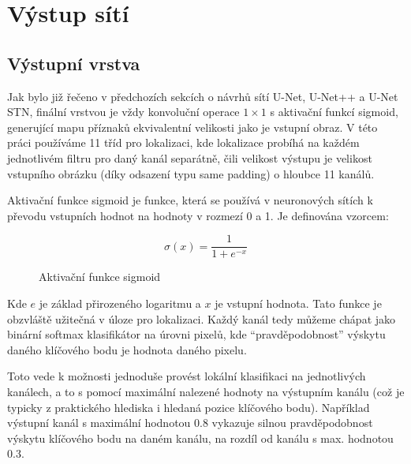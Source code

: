 \section{Výstup sítí}
\label{sec:Chapter46}
\subsection{Výstupní vrstva}
Jak bylo již řečeno v předchozích sekcích o návrhů sítí U-Net, U-Net++ a U-Net STN, finální vrstvou je vždy konvoluční operace $1\times1$ s aktivační funkcí sigmoid, generující mapu příznaků ekvivalentní velikosti jako je vstupní obraz. V této práci používáme 11 tříd pro lokalizaci, kde lokalizace probíhá na každém jednotlivém filtru pro daný kanál separátně, čili velikost výstupu je velikost vstupního obrázku (díky odsazení typu same padding) o hloubce 11 kanálů.

Aktivační funkce sigmoid je funkce, která se používá v neuronových sítích k převodu vstupních hodnot na hodnoty v rozmezí 0 a 1. Je definována vzorcem:

\begin{equation}
\sigma(x) = \frac{1}{1+e^{-x}}
\end{equation}

\begin{figure}[ht]
    \centering
    \caption[Aktivační funkce sigmoid]{Aktivační funkce sigmoid}
    \label{fig:sigmoid}
\end{figure}

Kde $e$ je základ přirozeného logaritmu a $x$ je vstupní hodnota. Tato funkce je obzvláště užitečná v úloze pro lokalizaci. Každý kanál tedy můžeme chápat jako binární softmax klasifikátor na úrovni pixelů, kde \enquote{pravděpodobnost} výskytu daného klíčového bodu je hodnota daného pixelu.

Toto vede k možnosti jednoduše provést lokální klasifikaci na jednotlivých kanálech, a to s pomocí maximální nalezené hodnoty na výstupním kanálu (což je typicky z praktického hlediska i hledaná pozice klíčového bodu). Například výstupní kanál s maximální hodnotou 0.8 vykazuje silnou pravděpodobnost výskytu klíčového bodu na daném kanálu, na rozdíl od kanálu s max. hodnotou 0.3.

